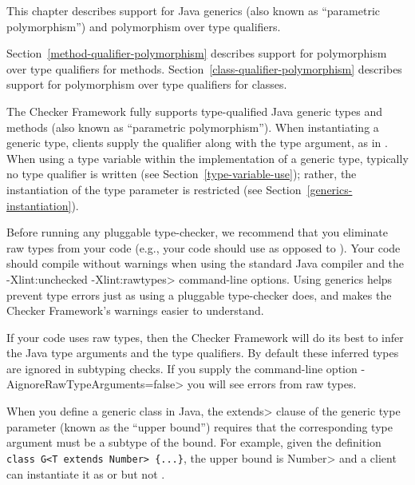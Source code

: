 \htmlhr
{}

This chapter describes support for Java generics (also known as
``parametric polymorphism'') and polymorphism over type qualifiers.

Section~\ref{method-qualifier-polymorphism} describes support for polymorphism over
type qualifiers for methods. Section~\ref{class-qualifier-polymorphism} describes
support for polymorphism over type qualifiers for classes.



The Checker Framework fully supports
type-qualified Java generic types and methods (also known as ``parametric
polymorphism'').
When instantiating a generic type,
clients supply the qualifier along with the type argument, as in
.
When using a type variable  within the implementation of a generic type,
typically no type qualifier is written (see Section~\ref{type-variable-use});
rather, the instantiation of the type parameter is restricted (see
Section~\ref{generics-instantiation}).



Before running any pluggable type-checker, we recommend that you eliminate
raw types from your code (e.g., your code should use  as
opposed to ).
Your code should compile without warnings when using the standard Java
compiler and the \<-Xlint:unchecked -Xlint:rawtypes> command-line options.
Using generics helps prevent type errors just as using a pluggable
type-checker does, and makes the Checker Framework's warnings easier to
understand.

If your code uses raw types, then the Checker Framework will do its best to
infer the Java type arguments and the type qualifiers.  By default these
inferred types are ignored in subtyping checks. If you supply the
command-line option \<-AignoreRawTypeArguments=false> you will see errors
from raw types.



When you define a generic class in Java, the \<extends> clause
of the generic type parameter (known as the ``upper bound'') requires that
the corresponding type argument must be a subtype of the bound.
For example, given the definition
\verb|class G<T extends Number> {...}|,
the upper bound is \<Number>
and a client can instantiate it as  or 
but not .

